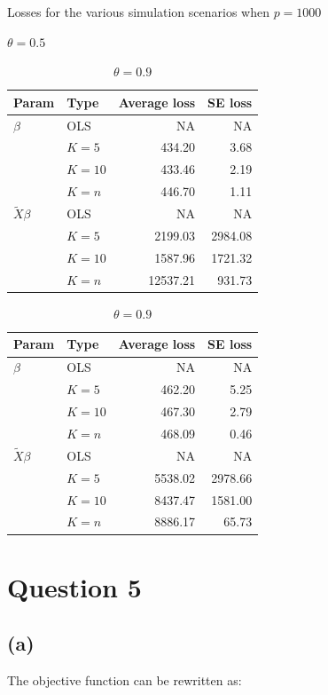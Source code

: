 \documentclass{article}\usepackage[]{graphicx}\usepackage[]{color}
\begin{document}
 
\begin{table}[!htb]
    \caption{Losses for the various simulation scenarios when $p=1000$}
    \label{tab:p1000}
    \begin{subtable}{.5\linewidth}
      \caption{$\theta=0.5$}
      \centering
      \begin{tabular}{|llrr|}
       \hline
     Param & Type & Average loss & SE loss \\ 
      \hline
  $\beta$ & OLS & NA & NA \\ 
  & $K=5$ & 434.20 & 3.68 \\ 
  & $K=10$ & 433.46 & 2.19 \\ 
  & $K=n$ & 446.70 & 1.11 \\ 
  \hline
  $\tilde{X}\beta$ & OLS & NA & NA  \\ 
  & $K=5$ & 2199.03 & 2984.08 \\ 
  & $K=10$ & 1587.96 & 1721.32 \\ 
  & $K=n$ & 12537.21 & 931.73 \\ 
    \hline
  \end{tabular}
  \end{subtable}%
  \begin{subtable}{.5\linewidth}
      \centering
        \caption{$\theta=0.9$}
        \begin{tabular}{|llrr|}
       \hline
     Param & Type & Average loss & SE loss \\ 
      \hline
  $\beta$ & OLS & NA & NA \\ 
  & $K=5$ & 462.20 & 5.25 \\ 
  & $K=10$ & 467.30 & 2.79 \\ 
  & $K=n$ & 468.09 & 0.46 \\ 
  \hline
  $\tilde{X}\beta$ & OLS & NA & NA  \\ 
  & $K=5$ & 5538.02 & 2978.66 \\ 
  & $K=10$ & 8437.47 & 1581.00 \\ 
  & $K=n$ & 8886.17 & 65.73 \\
    \hline
  \end{tabular}
    \end{subtable} 
\end{table}


\section*{Question 5}
\subsection*{(a)}
The objective function can be rewritten as:
\end{document}
